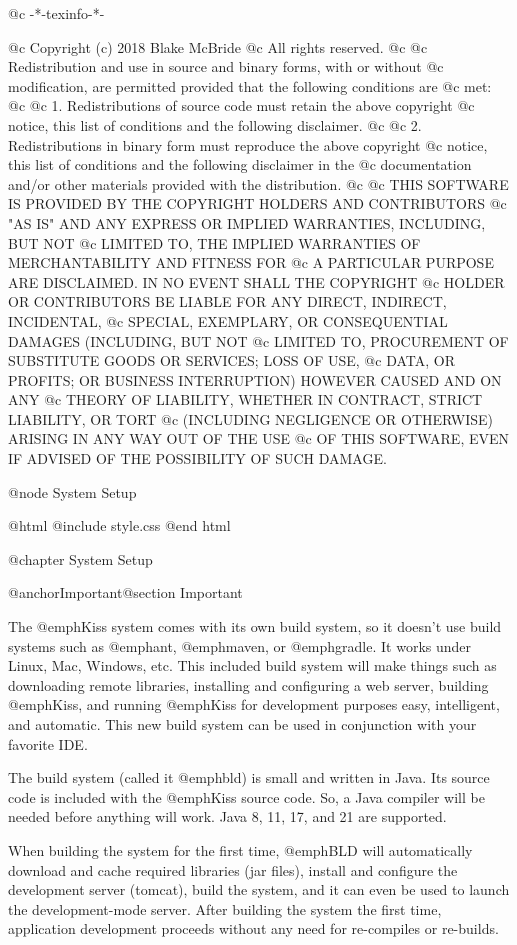 @c -*-texinfo-*-

@c  Copyright (c) 2018 Blake McBride
@c  All rights reserved.
@c
@c  Redistribution and use in source and binary forms, with or without
@c  modification, are permitted provided that the following conditions are
@c  met:
@c
@c  1. Redistributions of source code must retain the above copyright
@c  notice, this list of conditions and the following disclaimer.
@c
@c  2. Redistributions in binary form must reproduce the above copyright
@c  notice, this list of conditions and the following disclaimer in the
@c  documentation and/or other materials provided with the distribution.
@c
@c  THIS SOFTWARE IS PROVIDED BY THE COPYRIGHT HOLDERS AND CONTRIBUTORS
@c  "AS IS" AND ANY EXPRESS OR IMPLIED WARRANTIES, INCLUDING, BUT NOT
@c  LIMITED TO, THE IMPLIED WARRANTIES OF MERCHANTABILITY AND FITNESS FOR
@c  A PARTICULAR PURPOSE ARE DISCLAIMED. IN NO EVENT SHALL THE COPYRIGHT
@c  HOLDER OR CONTRIBUTORS BE LIABLE FOR ANY DIRECT, INDIRECT, INCIDENTAL,
@c  SPECIAL, EXEMPLARY, OR CONSEQUENTIAL DAMAGES (INCLUDING, BUT NOT
@c  LIMITED TO, PROCUREMENT OF SUBSTITUTE GOODS OR SERVICES; LOSS OF USE,
@c  DATA, OR PROFITS; OR BUSINESS INTERRUPTION) HOWEVER CAUSED AND ON ANY
@c  THEORY OF LIABILITY, WHETHER IN CONTRACT, STRICT LIABILITY, OR TORT
@c  (INCLUDING NEGLIGENCE OR OTHERWISE) ARISING IN ANY WAY OUT OF THE USE
@c  OF THIS SOFTWARE, EVEN IF ADVISED OF THE POSSIBILITY OF SUCH DAMAGE.


@node System Setup

@html
@include style.css
@end html

@chapter System Setup

@anchor{Important}@section Important

The @emph{Kiss} system comes with its own build system, so it doesn't
use build systems such as @emph{ant}, @emph{maven}, or @emph{gradle}.
It works under Linux, Mac, Windows, etc. This included build system
will make things such as downloading remote libraries, installing and
configuring a web server, building @emph{Kiss}, and running
@emph{Kiss} for development purposes easy, intelligent, and automatic.
This new build system can be used in conjunction with your favorite IDE.

The build system (called it @emph{bld}) is small and written in Java.
Its source code is included with the @emph{Kiss} source code.  So, a
Java compiler will be needed before anything will work.  
Java 8, 11, 17, and 21 are supported.

When building the system for the first time, @emph{BLD} will
automatically download and cache required libraries (jar files), install and
configure the development server (tomcat), build the system, and it
can even be used to launch the development-mode server.  After building
the system the first time, application development proceeds without
any need for re-compiles or re-builds.

